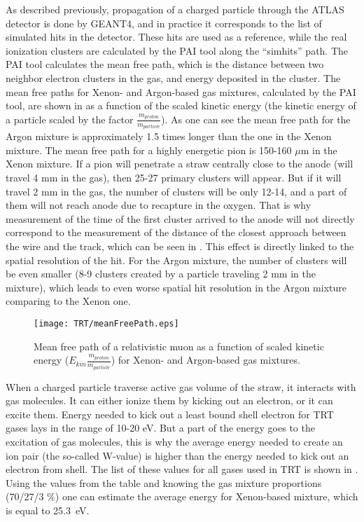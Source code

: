 As described previously, propagation of a charged particle through the ATLAS detector is done by GEANT4, and in practice it corresponds to the list of simulated hits in the detector.
These hits are used as a reference, while the real ionization clusters are calculated by the PAI tool along the ``simhits'' path.
The PAI tool calculates the mean free path, which is the distance between two neighbor electron clusters in the gas, and energy deposited in the cluster. 
The mean free paths for Xenon- and Argon-based gas mixtures, calculated by the PAI tool, are shown in  as a function of the scaled kinetic energy 
(the kinetic energy of a particle scaled by the factor $\frac{m_{proton}}{m_{particle}}$). As one can see the mean free path for the Argon mixture is approximately 1.5 times longer than the one in the Xenon mixture.
The mean free path for a highly energetic pion is 150-160 $\mu$m in the Xenon mixture. If a pion will penetrate a straw centrally close to the anode (will travel 4 mm in the gas), then 25-27 primary clusters will appear.
But if it will travel 2 mm in the gas, the number of clusters will be only 12-14, and a part of them will not reach anode due to recapture in the oxygen. 
That is why measurement of the time of the first cluster arrived to the anode will not directly correspond to the measurement of the distance of the closest approach between the wire and the track, 
which can be seen in . This effect is directly linked to the spatial resolution of the hit.
For the Argon mixture, the number of clusters will be even smaller (8-9 clusters created by a particle traveling 2 mm in the mixture), which leads to even worse spatial hit resolution in the Argon mixture comparing 
to the Xenon one.

\begin{figure}
\centering
 \texttt{[image: TRT/meanFreePath.eps]}
\caption{Mean free path of a relativistic muon as a function of scaled kinetic energy ($E_{kin}\frac{m_{proton}}{m_{particle}}$) for Xenon- and Argon-based gas mixtures.}
\label{fig:meanFreePath}
\end{figure}

When a charged particle traverse active gas volume of the straw, it interacts with gas molecules.
It can either ionize them by kicking out an electron, or it can excite them. Energy needed to kick out a least bound shell electron for TRT gases lays
in the range of 10-20 eV. But a part of the energy goes to the excitation of gas molecules, this is why the average energy needed to create an ion pair (the so-called W-value) is higher than the energy needed to 
kick out an electron from shell. The list of these values for all gases used in TRT is shown in .
Using the values from the table and knowing the gas mixture proportions (70/27/3 $\%$) one can estimate the average energy for Xenon-based mixture, which is equal to 25.3~eV.

